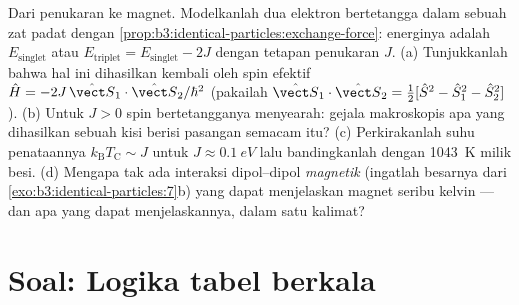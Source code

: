 \begin{exercise}[$\star\star\star$]\label{exo:b3:identical-particles:12}
Dari penukaran ke magnet. Modelkanlah dua elektron bertetangga dalam
sebuah zat padat dengan
\cref{prop:b3:identical-particles:exchange-force}: energinya adalah
$E_{\text{singlet}}$ atau $E_{\text{triplet}} =
E_{\text{singlet}} - 2J$ dengan tetapan penukaran $J$. (a) Tunjukkanlah
bahwa hal ini dihasilkan kembali oleh  spin efektif $\hat H =
-2J\,\hat{\vect S}_1\cdot\hat{\vect S}_2/\hbar^2$ (pakailah
$\hat{\vect S}_1\cdot\hat{\vect S}_2 = \tfrac12[\hat S^2 - \hat
S_1^2 - \hat S_2^2]$). (b) Untuk $J > 0$ spin bertetangganya menyearah:
gejala makroskopis apa yang dihasilkan sebuah kisi berisi pasangan
semacam itu? (c) Perkirakanlah suhu penataannya $k_{\text{B}}T_{\text{C}}
\sim J$ untuk $J \approx \qty{0.1}{eV}$ lalu bandingkanlah dengan
\qty{1043}{K} milik besi. (d) Mengapa tak ada interaksi dipol--dipol
\emph{magnetik} (ingatlah besarnya dari
\cref{exo:b3:identical-particles:7}b) yang dapat menjelaskan magnet
seribu kelvin --- dan apa yang dapat menjelaskannya, dalam satu kalimat?
\end{exercise}

\section{Soal: Logika tabel berkala}

